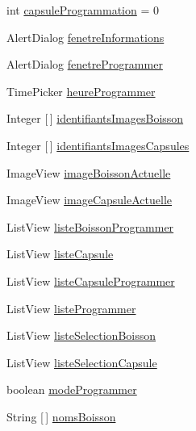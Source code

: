 \begin{DoxyCompactItemize}
int \hyperlink{classcom_1_1example_1_1ekawa_1_1_ihm_a2ddf5b95e2a3fbb3a15d160ba266295a}{capsule\+Programmation} = 0
\item 
Alert\+Dialog \hyperlink{classcom_1_1example_1_1ekawa_1_1_ihm_a369f219339f23afe8a6d1d93bf6611ca}{fenetre\+Informations}
\item 
Alert\+Dialog \hyperlink{classcom_1_1example_1_1ekawa_1_1_ihm_addac9c5f93086d06e5131cd42f3be941}{fenetre\+Programmer}
\item 
Time\+Picker \hyperlink{classcom_1_1example_1_1ekawa_1_1_ihm_ac6f46062030a20efac18673970d37547}{heure\+Programmer}
\item 
Integer \mbox{[}$\,$\mbox{]} \hyperlink{classcom_1_1example_1_1ekawa_1_1_ihm_aab3ed36de15018dd29af2df4b3e150e4}{identifiants\+Images\+Boisson}
\item 
Integer \mbox{[}$\,$\mbox{]} \hyperlink{classcom_1_1example_1_1ekawa_1_1_ihm_af35b42764d9f7b10c8bc0e210c3ba76d}{identifiants\+Images\+Capsules}
\item 
Image\+View \hyperlink{classcom_1_1example_1_1ekawa_1_1_ihm_a2d83809a52b5f9a97f7817ae183c456d}{image\+Boisson\+Actuelle}
\item 
Image\+View \hyperlink{classcom_1_1example_1_1ekawa_1_1_ihm_a82418c4769be80ea67628e2ae8e85ee4}{image\+Capsule\+Actuelle}
\item 
List\+View \hyperlink{classcom_1_1example_1_1ekawa_1_1_ihm_a8badf9f0485d205f8a379e54b01deab7}{liste\+Boisson\+Programmer}
\item 
List\+View \hyperlink{classcom_1_1example_1_1ekawa_1_1_ihm_a955e0c1674ee1ddfbf05f3ef6a081d67}{liste\+Capsule}
\item 
List\+View \hyperlink{classcom_1_1example_1_1ekawa_1_1_ihm_adfeb58df0ce9fa2088a7a708a54ffe07}{liste\+Capsule\+Programmer}
\item 
List\+View \hyperlink{classcom_1_1example_1_1ekawa_1_1_ihm_a4fd152e506a6b1130477795d8c2d2a83}{liste\+Programmer}
\item 
List\+View \hyperlink{classcom_1_1example_1_1ekawa_1_1_ihm_a6f81eeec5d65c16e33b7ac67b4e771cb}{liste\+Selection\+Boisson}
\item 
List\+View \hyperlink{classcom_1_1example_1_1ekawa_1_1_ihm_a0842447d70bca2098431fa532c1c94e8}{liste\+Selection\+Capsule}
\item 
boolean \hyperlink{classcom_1_1example_1_1ekawa_1_1_ihm_acc8db4ba4fa39c343412d6ff57c2acbd}{mode\+Programmer}
\item 
String \mbox{[}$\,$\mbox{]} \hyperlink{classcom_1_1example_1_1ekawa_1_1_ihm_abafa700d1d1f943bd3e9678f698ed33a}{noms\+Boisson}

\end{DoxyCompactItemize}
